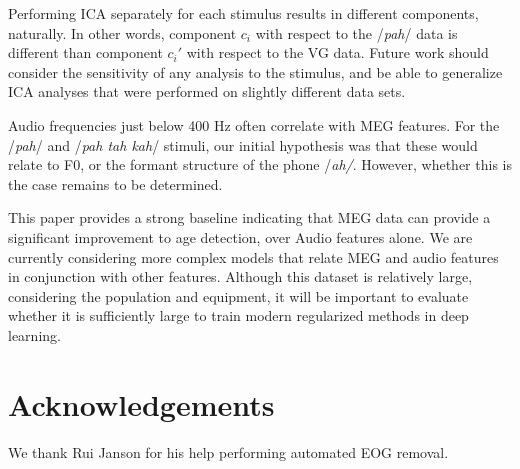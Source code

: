 \documentclass[a4paper]{article}
\newcommand{\FR}[1]{{\small \textcolor{red}{\hl{#1}}}}
\begin{document}
Performing ICA separately for each stimulus results in different components, naturally. In other words, component $c_i$ with respect to the /{\em pah}/ data is different than component $c_i'$ with respect to the VG data. Future work should consider the sensitivity of any analysis to the stimulus, and be able to generalize ICA analyses that were performed on slightly different data sets. 

Audio frequencies just below 400 Hz often correlate with MEG features. For the /{\em pah}/ and /{\em pah tah kah}/ stimuli, our initial hypothesis was that these would relate to F0, or the formant structure of the phone /{\em ah/}. However, whether this is the case remains to be determined.


This paper provides a strong baseline indicating that MEG data can provide a significant improvement to age detection, over Audio features alone. We are currently considering more complex models that relate MEG and audio features in conjunction with other features. Although this dataset is relatively large, considering the population and equipment, it will be important to evaluate whether it is sufficiently large to train modern regularized methods in deep learning.

\section{Acknowledgements}

We thank Rui Janson for his help performing automated EOG removal.





\end{document}
